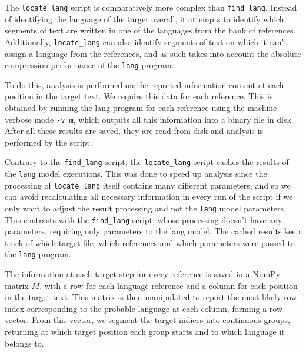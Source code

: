 \documentclass{article}
\begin{document}
The \texttt{locate\_lang} script is comparatively more complex than \texttt{find\_lang}.
Instead of identifying the language of the target overall, it attempts to identify which segments of text are written in one of the languages from the bank of references.
Additionally, \texttt{locate\_lang} can also identify segments of text on which it can't assign a language from the references, and as such takes into account the absolute compression performance of the \texttt{lang} program.

To do this, analysis is performed on the reported information content at each position in the target text.
We require this data for each reference.
This is obtained by running the lang program for each reference using the machine verbose mode \texttt{-v m}, which outputs all this information into a binary file in disk.
After all these results are saved, they are read from disk and analysis is performed by the script.

Contrary to the \texttt{find\_lang} script, the \texttt{locate\_lang} script caches the results of the \texttt{lang} model executions.
This was done to speed up analysis since the processing of \texttt{locate\_lang} itself contains many different parameters, and so we can avoid recalculating all necessary information in every run of the script if we only want to adjust the result processing and not the \texttt{lang} model parameters.
This contrasts with the \texttt{find\_lang} script, whose processing doesn't have any parameters, requiring only parameters to the lang model.
The cached results keep track of which target file, which references and which parameters were passed to the \texttt{lang} program.

The information at each target step for every reference is saved in a NumPy matrix $M$, with a row for each language reference and a column for each position in the target text.
This matrix is then manipulated to report the most likely row index corresponding to the probable language at each column, forming a row vector.
From this vector, we segment the target indices into continuous groups, returning at which target position each group starts and to which language it belongs to.
\end{document}
